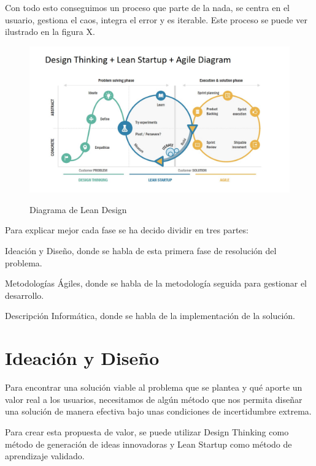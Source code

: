 \documentclass[12pt,twoside,titlepage]{report}
\begin{document}
Con todo esto conseguimos un proceso que parte de la nada, se centra en el usuario, gestiona el caos, integra el error y es iterable. Este proceso se puede ver ilustrado en la figura X.

\begin{figure}[H] 
    \includegraphics[scale=0.3]{leandesignagile}
    \centering
    \label{fig:Lean Design Agile}
    \caption{Diagrama de Lean Design}
\end{figure}

Para explicar mejor cada fase se ha decido dividir en tres partes: 

\begin{compactitem}
    \item Ideación y Diseño, donde se habla de esta primera fase de resolución del problema.
    \item Metodologías Ágiles, donde se habla de la metodología seguida para gestionar el desarrollo.
    \item Descripción Informática, donde se habla de la implementación de la solución.
\end{compactitem}

\section{Ideación y Diseño}

Para encontrar una solución viable al problema que se plantea y qué aporte un valor real a los usuarios, necesitamos de algún método que nos permita diseñar una solución de manera efectiva bajo unas condiciones de incertidumbre extrema.

Para crear esta propuesta de valor, se puede utilizar Design Thinking como método de generación de ideas innovadoras y Lean Startup como método de aprendizaje validado.
\end{document}
